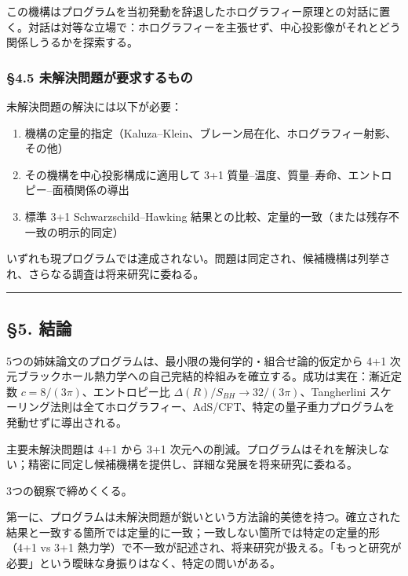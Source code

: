 \documentclass[a4paper,11pt]{ltjsarticle}
\theoremstyle{definition}
\providecommand{\tightlist}{\setlength{\itemsep}{0pt}\setlength{\parskip}{0pt}}
\begin{document}
この機構はプログラムを当初発動を辞退したホログラフィー原理との対話に置く。対話は対等な立場で：ホログラフィーを主張せず、中心投影像がそれとどう関係しうるかを探索する。

\subsubsection{§4.5
未解決問題が要求するもの}\label{ux672aux89e3ux6c7aux554fux984cux304cux8981ux6c42ux3059ux308bux3082ux306e}

未解決問題の解決には以下が必要：

\begin{enumerate}
\def\labelenumi{\arabic{enumi}.}
\tightlist
\item
  機構の定量的指定（Kaluza--Klein、ブレーン局在化、ホログラフィー射影、その他）
\item
  その機構を中心投影構成に適用して 3+1
  質量--温度、質量--寿命、エントロピー--面積関係の導出
\item
  標準 3+1 Schwarzschild--Hawking
  結果との比較、定量的一致（または残存不一致の明示的同定）
\end{enumerate}

いずれも現プログラムでは達成されない。問題は同定され、候補機構は列挙され、さらなる調査は将来研究に委ねる。

\begin{center}\rule{0.5\linewidth}{0.5pt}\end{center}

\subsection{§5. 結論}\label{ux7d50ux8ad6}

5つの姉妹論文のプログラムは、最小限の幾何学的・組合せ論的仮定から 4+1
次元ブラックホール熱力学への自己完結的枠組みを確立する。成功は実在：漸近定数
\(c = 8/(3\pi)\)、エントロピー比
\(\Delta(R)/S_{BH} \to 32/(3\pi)\)、Tangherlini
スケーリング法則は全てホログラフィー、AdS/CFT、特定の量子重力プログラムを発動せずに導出される。

主要未解決問題は 4+1 から 3+1
次元への削減。プログラムはそれを解決しない；精密に同定し候補機構を提供し、詳細な発展を将来研究に委ねる。

3つの観察で締めくくる。

第一に、プログラムは未解決問題が鋭いという方法論的美徳を持つ。確立された結果と一致する箇所では定量的に一致；一致しない箇所では特定の定量的形（4+1
vs 3+1
熱力学）で不一致が記述され、将来研究が扱える。「もっと研究が必要」という曖昧な身振りはなく、特定の問いがある。
\end{document}
